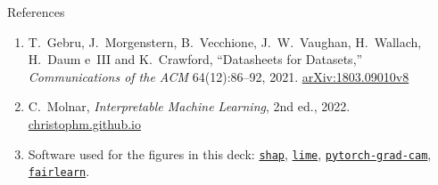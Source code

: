 \begin{frame}[allowframebreaks]{References}
\begin{enumerate}
          \href{https://arxiv.org/abs/1810.03993v2}{arXiv:1810.03993v2}
    \item T.~Gebru, J.~Morgenstern, B.~Vecchione, J.~W.~Vaughan, H.~Wallach, H.~Daum e~III
          and K.~Crawford, ``Datasheets for Datasets,'' \emph{Communications of the ACM}
          64(12):86--92, 2021. \href{https://arxiv.org/abs/1803.09010v8}{arXiv:1803.09010v8}
    \item C.~Molnar, \emph{Interpretable Machine Learning}, 2nd ed., 2022.
          \href{https://christophm.github.io/interpretable-ml-book/}{christophm.github.io}
    \item Software used for the figures in this deck:
          \href{https://github.com/shap/shap}{\texttt{shap}},
          \href{https://github.com/marcotcr/lime}{\texttt{lime}},
          \href{https://github.com/jacobgil/pytorch-grad-cam}{\texttt{pytorch-grad-cam}},
          \href{https://fairlearn.org/}{\texttt{fairlearn}}.
  \end{enumerate}
\end{frame}
